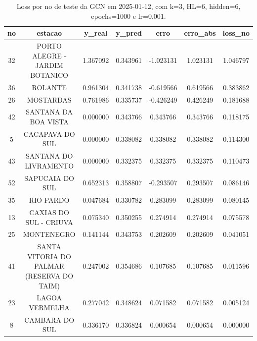 \begin{table}[h]
\centering
\caption{Loss por no de teste da GCN em 2025-01-12, com k=3, HL=6, hidden=6, epochs=1000 e lr=0.001.}
\label{tab:gcn_loss_k3_hl6_h6_e1000_d20250112}
\begin{tabular}{ccccccc}
\toprule
no & estacao & y\_real & y\_pred & erro & erro\_abs & loss\_no \\
\midrule
32 & PORTO ALEGRE - JARDIM BOTANICO & 1.367092 & 0.343961 & -1.023131 & 1.023131 & 1.046797 \\
36 & ROLANTE & 0.961304 & 0.341738 & -0.619566 & 0.619566 & 0.383862 \\
26 & MOSTARDAS & 0.761986 & 0.335737 & -0.426249 & 0.426249 & 0.181688 \\
42 & SANTANA DA BOA VISTA & 0.000000 & 0.343766 & 0.343766 & 0.343766 & 0.118175 \\
5 & CACAPAVA DO SUL & 0.000000 & 0.338082 & 0.338082 & 0.338082 & 0.114300 \\
43 & SANTANA DO LIVRAMENTO & 0.000000 & 0.332375 & 0.332375 & 0.332375 & 0.110473 \\
52 & SAPUCAIA DO SUL & 0.652313 & 0.358807 & -0.293507 & 0.293507 & 0.086146 \\
35 & RIO PARDO & 0.047684 & 0.330782 & 0.283099 & 0.283099 & 0.080145 \\
13 & CAXIAS DO SUL - CRIUVA & 0.075340 & 0.350255 & 0.274914 & 0.274914 & 0.075578 \\
25 & MONTENEGRO & 0.141144 & 0.343753 & 0.202609 & 0.202609 & 0.041051 \\
41 & SANTA VITORIA DO PALMAR (RESERVA DO TAIM) & 0.247002 & 0.354686 & 0.107685 & 0.107685 & 0.011596 \\
23 & LAGOA VERMELHA & 0.277042 & 0.348624 & 0.071582 & 0.071582 & 0.005124 \\
8 & CAMBARA DO SUL & 0.336170 & 0.336824 & 0.000654 & 0.000654 & 0.000000 \\
\bottomrule
\end{tabular}
\end{table}

